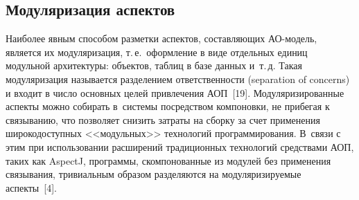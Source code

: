 \begin{multicols}{2}
\section{Модуляризация аспектов}

 Наиболее явным способом разметки аспектов, составляющих АО-модель,
является их модуляризация, т.\,е.\ оформление в виде отдельных единиц
модульной архитектуры: объектов, таблиц в базе данных и~т.\,д. Такая
модуляризация называется разделением ответственности (separation of concerns)
и входит в число основных целей привлечения АОП~[19].
Модуляризированные аспекты можно собирать в~системы посредством
компоновки, не прибегая к связыванию, что позволяет снизить затраты на
сборку за счет применения широкодоступных <<модульных>> технологий
программирования. В~связи с этим при использовании расширений
традиционных технологий средствами АОП, таких как AspectJ, программы,
скомпонованные из модулей без применения связывания, тривиальным образом
разделяются на модуляризируемые аспекты~[4].


\end{multicols}
